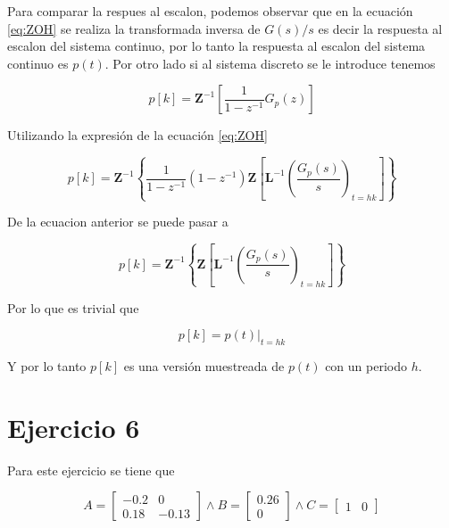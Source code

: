 \documentclass{article}
\begin{document}
    Para comparar la respues al escalon, podemos observar que en la ecuación \ref{eq:ZOH} se realiza la 
    transformada inversa de $G(s)/s$ es decir la respuesta al escalon del sistema continuo, por lo tanto 
    la respuesta al escalon del sistema continuo es $p(t)$. Por otro lado si al sistema discreto se le 
    introduce tenemos 

    \begin{equation}
        p[k] = \textbf{Z}^{-1} \left[ \frac{1}{1-z^{-1}}G_p(z) \right]
    \end{equation}

    Utilizando la expresión de la ecuación \ref{eq:ZOH}

    \begin{equation}
        p[k] = \textbf{Z}^{-1} \left\{ \frac{1}{1-z^{-1}} (1 - z^{-1}) \textbf{Z} \left[ \textbf{L}^{-1} \left( \frac{G_p(s)}{s}  \right)_{t=hk}  \right]  \right\}
    \end{equation}

    De la ecuacion anterior se puede pasar a 

    \begin{equation}
        p[k] = \textbf{Z}^{-1} \left\{  \textbf{Z} \left[ \textbf{L}^{-1} \left( \frac{G_p(s)}{s}  \right)_{t=hk}  \right]  \right\}
    \end{equation}

    Por lo que es trivial que 

    \begin{equation}
        p[k] = p(t)|_{t=hk}
    \end{equation}

    Y por lo tanto $p[k]$ es una versión muestreada de $p(t)$ con un periodo $h$.

    \section{Ejercicio 6}

        Para este ejercicio se tiene que 

        \begin{equation}
            A = \begin{bmatrix}
                    -0.2 & 0 \\
                    0.18 & -0.13 
                \end{bmatrix}
            \land 
            B = \begin{bmatrix}
                    0.26 \\    
                    0
                \end{bmatrix}
            \land 
            C = \begin{bmatrix}
                    1 & 0
                \end{bmatrix}
        \end{equation}
\end{document}
